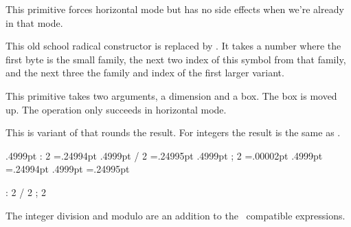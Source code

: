 \startnewprimitive[title={\prm {quitvmode}}]

This primitive forces horizontal mode but has no side effects when we're already
in that mode.

\stopnewprimitive

\startoldprimitive[title={\prm {radical}}][obsolete=yes]

This old school radical constructor is replaced by . It takes a
number where the first byte is the small family, the next two index of this
symbol from that family, and the next three the family and index of the first
larger variant.

\stopoldprimitive

\startoldprimitive[title={\prm {raise}}]

This primitive takes two arguments, a dimension and a box. The box is moved up.
The operation only succeeds in horizontal mode.

\stopoldprimitive

\startnewprimitive[title={\prm {rdivide}}]

This is variant of  that rounds the result. For integers the result
is the same as .

\startbuffer
\the\dimexpr .4999pt                     : 2 \relax            =.24994pt
\the\dimexpr .4999pt                     / 2 \relax            =.24995pt
\the\dimexpr .4999pt                     ; 2 \relax            =.00002pt
\scratchdimen.4999pt \divide {} \the\scratchdimen =.24994pt
\scratchdimen.4999pt \edivide{} \the\scratchdimen =.24995pt
\scratchdimen 4999pt \rdivide{} \the\scratchdimen =2500.0pt
\scratchdimen 5000pt \rdivide{} \the\scratchdimen =2500.0pt

\the{}                       : 2 
\the{}                       / 2 
\the{}                       ; 2 
 \divide {} \the{}
 \edivide{} \the{}
 \rdivide{} \the{}
\stopbuffer

\typebuffer

\startlines
\getbuffer
\stoplines

The integer division \type{:} and modulo \type {;} are an addition to the \ETEX\
compatible expressions.

\stopnewprimitive

